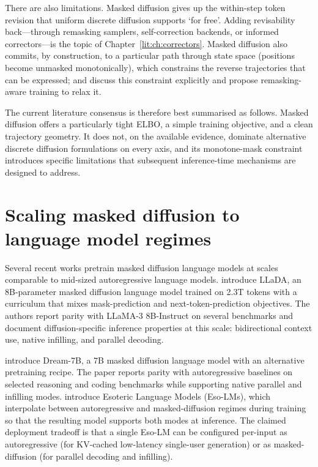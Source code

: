 There are also limitations. Masked diffusion gives up the within-step token
revision that uniform discrete diffusion supports `for free'. Adding
revisability back---through remasking samplers, self-correction backends,
or informed correctors---is the topic of Chapter~\ref{lit:ch:correctors}.
Masked diffusion also commits, by construction, to a particular path
through state space (positions become unmasked monotonically), which
constrains the reverse trajectories that can be expressed; \textcite{wu2026dsl}
and \textcite{huang2025remedi} discuss this constraint explicitly and
propose remasking-aware training to relax it.

The current literature consensus is therefore best summarised as follows.
Masked diffusion offers a particularly tight ELBO, a simple training
objective, and a clean trajectory geometry. It does not, on the available
evidence, dominate alternative discrete diffusion formulations on every
axis, and its monotone-mask constraint introduces specific limitations that
subsequent inference-time mechanisms are designed to address.

\section{Scaling masked diffusion to language model regimes}
\label{lit:sec:scaling}

Several recent works pretrain masked diffusion language models at scales
comparable to mid-sized autoregressive language models.
\textcite{nie2025llada} introduce LLaDA, an 8B-parameter masked diffusion
language model trained on 2.3T tokens with a curriculum that mixes
mask-prediction and next-token-prediction objectives. The authors report
parity with LLaMA-3 8B-Instruct on several benchmarks and document
diffusion-specific inference properties at this scale: bidirectional
context use, native infilling, and parallel decoding.

\textcite{ye2025dream} introduce Dream-7B, a 7B masked diffusion language
model with an alternative pretraining recipe. The paper reports parity
with autoregressive baselines on selected reasoning and coding benchmarks
while supporting native parallel and infilling modes.
\textcite{sahoo2025eso} introduce Esoteric Language Models (Eso-LMs),
which interpolate between autoregressive and masked-diffusion regimes
during training so that the resulting model supports both modes at
inference. The claimed deployment tradeoff is that a single Eso-LM can be
configured per-input as autoregressive (for KV-cached low-latency
single-user generation) or as masked-diffusion (for parallel decoding
and infilling).

